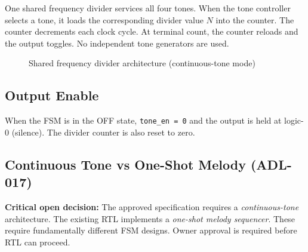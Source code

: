 \documentclass[11pt,a4paper]{article}
\begin{document}
One shared frequency divider services all four tones. When the tone controller selects a tone,
it loads the corresponding divider value $N$ into the counter. The counter decrements each clock
cycle. At terminal count, the counter reloads and the output toggles. No independent tone
generators are used.

\begin{figure}[H]
  \centering
  \caption{Shared frequency divider architecture (continuous-tone mode)}
\end{figure}

\subsection{Output Enable}

When the FSM is in the OFF state, \texttt{tone\_en = 0} and the output is held at logic-0
(silence). The divider counter is also reset to zero.

\subsection{Continuous Tone vs One-Shot Melody (ADL-017)}

\begin{mdframed}[backgroundcolor=unknown!10,linecolor=unknown]
  \textbf{Critical open decision:} The approved specification requires a \emph{continuous-tone}
  architecture. The existing RTL implements a \emph{one-shot melody sequencer}. These require
  fundamentally different FSM designs. Owner approval is required before RTL can proceed.
\end{mdframed}
\end{document}
